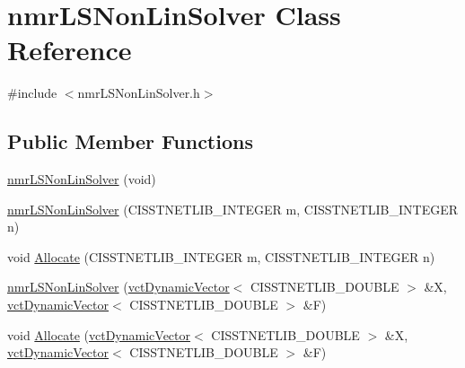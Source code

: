 \hypertarget{classnmr_l_s_non_lin_solver}{\section{nmr\-L\-S\-Non\-Lin\-Solver Class Reference}
\label{classnmr_l_s_non_lin_solver}
}


{\ttfamily \#include $<$nmr\-L\-S\-Non\-Lin\-Solver.\-h$>$}

\subsection*{Public Member Functions}
\begin{DoxyCompactItemize}
\item 
\hyperlink{classnmr_l_s_non_lin_solver_abe9e4c062db3cfc45144fcba00e5f980}{nmr\-L\-S\-Non\-Lin\-Solver} (void)
\item 
\hyperlink{classnmr_l_s_non_lin_solver_ad71720d43f800176a34e958796b8d229}{nmr\-L\-S\-Non\-Lin\-Solver} (C\-I\-S\-S\-T\-N\-E\-T\-L\-I\-B\-\_\-\-I\-N\-T\-E\-G\-E\-R m, C\-I\-S\-S\-T\-N\-E\-T\-L\-I\-B\-\_\-\-I\-N\-T\-E\-G\-E\-R n)
\item 
void \hyperlink{classnmr_l_s_non_lin_solver_af1449ecddc4c7c0301cac792d7eb28e2}{Allocate} (C\-I\-S\-S\-T\-N\-E\-T\-L\-I\-B\-\_\-\-I\-N\-T\-E\-G\-E\-R m, C\-I\-S\-S\-T\-N\-E\-T\-L\-I\-B\-\_\-\-I\-N\-T\-E\-G\-E\-R n)
\end{DoxyCompactItemize}
{\bf }\par
\begin{DoxyCompactItemize}
\item 
\hyperlink{classnmr_l_s_non_lin_solver_a249ee56a277a7d33fd9de29b599cb236}{nmr\-L\-S\-Non\-Lin\-Solver} (\hyperlink{classvct_dynamic_vector}{vct\-Dynamic\-Vector}$<$ C\-I\-S\-S\-T\-N\-E\-T\-L\-I\-B\-\_\-\-D\-O\-U\-B\-L\-E $>$ \&X, \hyperlink{classvct_dynamic_vector}{vct\-Dynamic\-Vector}$<$ C\-I\-S\-S\-T\-N\-E\-T\-L\-I\-B\-\_\-\-D\-O\-U\-B\-L\-E $>$ \&F)
\end{DoxyCompactItemize}

{\bf }\par
\begin{DoxyCompactItemize}
\item 
void \hyperlink{classnmr_l_s_non_lin_solver_a11fa2fa4e34aec01e92ab01eb35689fd}{Allocate} (\hyperlink{classvct_dynamic_vector}{vct\-Dynamic\-Vector}$<$ C\-I\-S\-S\-T\-N\-E\-T\-L\-I\-B\-\_\-\-D\-O\-U\-B\-L\-E $>$ \&X, \hyperlink{classvct_dynamic_vector}{vct\-Dynamic\-Vector}$<$ C\-I\-S\-S\-T\-N\-E\-T\-L\-I\-B\-\_\-\-D\-O\-U\-B\-L\-E $>$ \&F)
\end{DoxyCompactItemize}

